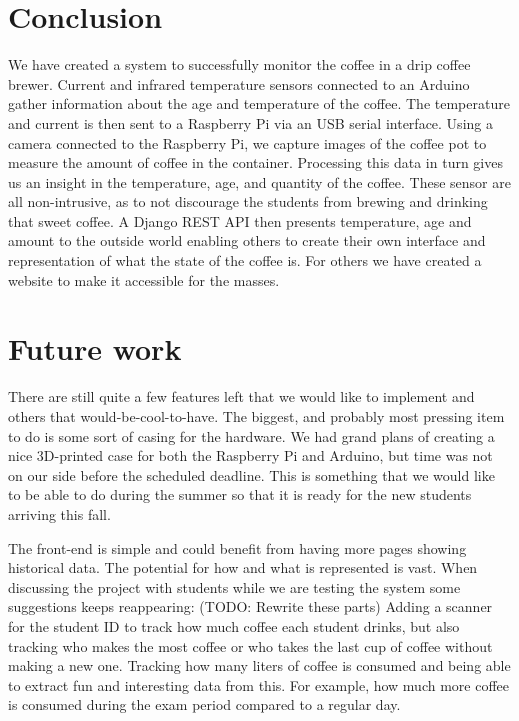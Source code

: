 \documentclass[12pt,a4paper,oneside,article]{memoir}
\numberwithin{equation}{chapter}
\begin{document}
\section{Conclusion}\label{sec:conclusion}
We have created a system to successfully monitor the coffee in a drip coffee 
brewer. Current and infrared temperature sensors connected to an Arduino 
gather information about the age and temperature of the coffee. The 
temperature and current is then sent to a Raspberry Pi via an USB serial
interface. Using a camera connected to the Raspberry Pi, we capture images of 
the coffee pot to measure the amount of coffee in the container. Processing 
this data in turn gives us an insight in the temperature, age, and quantity of 
the coffee. These sensor are all non-intrusive, as to not discourage the 
students from brewing and drinking that sweet coffee. A Django REST API then 
presents temperature, age and amount to the outside world enabling others to 
create their own interface and representation of what the state of the coffee 
is. For others we have created a website to make it accessible for the masses.
 
\section{Future work}\label{sec:future-work}
There are still quite a few features left that we would like to implement and 
others that would-be-cool-to-have. The biggest, and probably most pressing 
item to do is some sort of casing for the hardware. We had grand plans of 
creating a nice 3D-printed case for both the Raspberry Pi and Arduino, but time 
was not on our side before the scheduled deadline. This is something that we 
would like to be able to do during the summer so that it is ready for the new 
students arriving this fall.

The front-end is simple and could benefit from having more pages showing
historical data. The potential for how and what is represented is vast. When 
discussing the project with students while we are testing the system some
suggestions keeps reappearing:
(TODO: Rewrite these parts)
Adding a scanner for the student ID to track how much coffee each student 
drinks, but also tracking who makes the most coffee or who takes the last cup 
of coffee without making a new one.
Tracking how many liters of coffee is consumed and being able to
extract fun and interesting data from this. For example, how much more
coffee is consumed during the exam period compared to a regular day.
\end{document}
